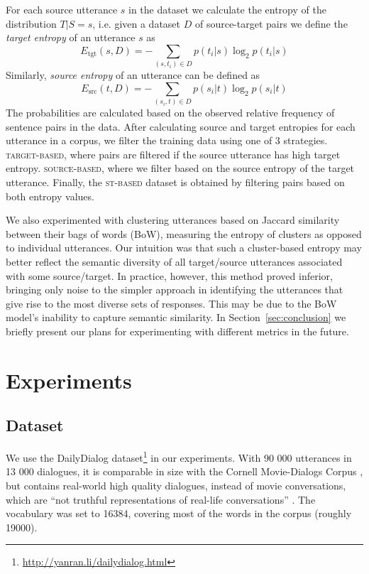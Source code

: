 \documentclass[11pt,a4paper]{article}
\begin{document}
For each source utterance $s$ in the dataset we calculate the entropy
of the distribution $T|S=s$, i.e. given a dataset $D$ of source-target
pairs we define the
\textit{target entropy} of an utterance $s$ as 
\[ E_{\text{tgt}}(s, D) = - \sum_{(s, t_i)\in D} p(t_i|s)\log_2 p(t_i|s)
\]
Similarly, \textit{source entropy} of an utterance can be defined as
\[ E_{\text{src}}(t, D) = - \sum_{(s_i, t)\in D} p(s_i|t)\log_2 p(s_i|t)
\]
The probabilities are calculated based on the observed relative frequency of sentence pairs in the data. After calculating source and target entropies for each utterance in a
corpus, we filter the training data using one of 3 strategies. \textsc{target-based}, where pairs are filtered if the source utterance
has high target entropy. \textsc{source-based}, where
we filter based on the source entropy of the target utterance.
Finally, the \textsc{st-based} dataset is obtained by filtering pairs based on
both entropy values.

We also experimented with clustering utterances based on Jaccard similarity
between their bags of words (BoW), measuring the entropy of clusters
as opposed to individual utterances. Our intuition was that such a
cluster-based entropy may better reflect the semantic diversity of
all target/source utterances associated with some source/target. In
practice, however, this method proved inferior, bringing only noise to the simpler approach
in identifying the utterances that give rise to the most diverse sets of
responses. This may be due to the BoW model's inability to capture
semantic similarity. In Section~\ref{sec:conclusion} we briefly present our plans
for experimenting with different metrics in the future.


\section{Experiments}
\label{sec:experiments}

\subsection{Dataset}
We use the DailyDialog
dataset\footnote{\url{http://yanran.li/dailydialog.html}} \cite{Li:2017b} in
our experiments. With 90 000 utterances in 13 000 dialogues, it is comparable in size
  with the Cornell Movie-Dialogs Corpus
\cite{Danescu:2011}, but contains real-world high quality dialogues, instead
of movie conversations, which are ``not truthful representations of real-life
conversations'' \cite{Danescu:2011}. The vocabulary was set to 16384, covering most of the words in the corpus (roughly 19000).
\end{document}
